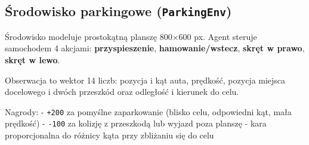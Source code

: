 \documentclass[11pt]{article}
\begin{document}
    \hypertarget{ux15brodowisko-parkingowe-parkingenv}{%
\subsection{\texorpdfstring{Środowisko parkingowe
(\texttt{ParkingEnv})}{Środowisko parkingowe (ParkingEnv)}}\label{ux15brodowisko-parkingowe-parkingenv}}

Środowisko modeluje prostokątną planszę 800×600 px. Agent steruje
samochodem 4 akcjami: \textbf{przyspieszenie},
\textbf{hamowanie/wstecz}, \textbf{skręt w prawo}, \textbf{skręt w
lewo}.

Obserwacja to wektor 14 liczb: pozycja i kąt auta, prędkość, pozycja
miejsca docelowego i dwóch przeszkód oraz odległość i kierunek do celu.

Nagrody: - \texttt{+200} za pomyślne zaparkowanie (blisko celu,
odpowiedni kąt, mała prędkość) - \texttt{-100} za kolizję z przeszkodą
lub wyjazd poza planszę - kara proporcjonalna do różnicy kąta przy
zbliżaniu się do celu
\end{document}
